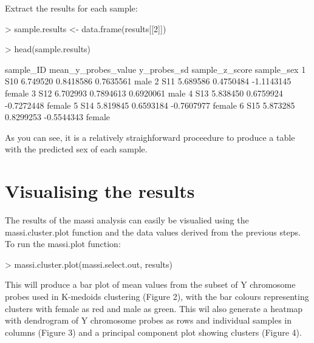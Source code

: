 \documentclass{article}
\begin{document}
Extract the results for each sample:
\begin{Schunk}
\begin{Sinput}
> sample.results <- data.frame(results[[2]])
\end{Sinput}
\end{Schunk}

\begin{Schunk}
\begin{Sinput}
> head(sample.results)
\end{Sinput}
\begin{Soutput}
  sample_ID mean_y_probes_value y_probes_sd sample_z_score sample_sex
1       S10            6.749520   0.8418586      0.7635561       male
2       S11            5.689586   0.4750484     -1.1143145     female
3       S12            6.702993   0.7894613      0.6920061       male
4       S13            5.838450   0.6759924     -0.7272448     female
5       S14            5.819845   0.6593184     -0.7607977     female
6       S15            5.873285   0.8299253     -0.5544343     female
\end{Soutput}
\end{Schunk}

As you can see, it is a relatively straighforward proceedure to produce a table with the predicted sex of each sample.

\section{Visualising the results}

The results of the massi analysis can easily be visualied using the massi.cluster.plot function and the data values derived from the previous steps. 
To run the massi.plot function:
\begin{Schunk}
\begin{Sinput}
> massi.cluster.plot(massi.select.out, results)
\end{Sinput}
\end{Schunk}
This will produce a bar plot of mean values from the subset of Y chromosome probes used in K-medoids clustering (Figure 2), with the bar colours representing clusters with female as red and male as green. This wil also generate a heatmap with dendrogram of Y chromosome probes as rows and individual samples in columns (Figure 3) and a principal component plot showing clusters (Figure 4). 
\clearpage
\end{document}
